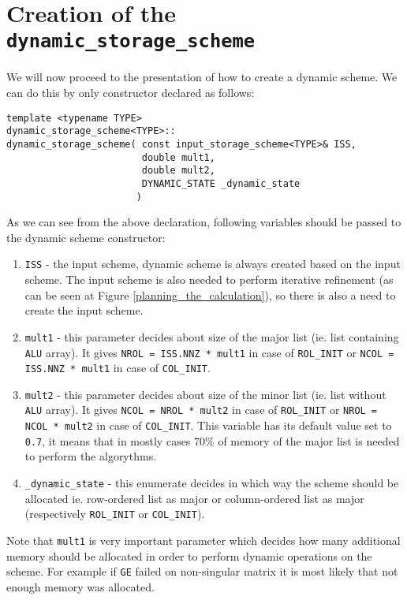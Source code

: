 \newpage

\section{Creation of the \texttt{dynamic\_storage\_scheme}}
We will now proceed to the presentation of how to create a dynamic scheme. We can do this by only constructor declared as follows:
\begin{verbatim}
template <typename TYPE>
dynamic_storage_scheme<TYPE>::
dynamic_storage_scheme( const input_storage_scheme<TYPE>& ISS,
                        double mult1,
                        double mult2,
                        DYNAMIC_STATE _dynamic_state
                       )
\end{verbatim}
\noindent As we can see from the above declaration, following variables should be passed to the dynamic scheme constructor:

\begin{enumerate}
	\item \texttt{ISS} - the input scheme, dynamic scheme is always created based on the input scheme. The input scheme is also needed to perform iterative refinement (as can be seen at Figure \ref{planning_the_calculation}), so there is also a need to create the input scheme.
	\item \texttt{mult1} - this parameter decides about size of the major list (ie. list containing \texttt{ALU} array). It gives \texttt{NROL = ISS.NNZ * mult1} in case of \texttt{ROL\_INIT} or \texttt{NCOL = ISS.NNZ * mult1} in case of \texttt{COL\_INIT}.
	\item \texttt{mult2} - this parameter decides about size of the minor list (ie. list without \texttt{ALU} array). It gives \texttt{NCOL = NROL * mult2} in case of \texttt{ROL\_INIT} or \texttt{NROL = NCOL * mult2} in case of \texttt{COL\_INIT}. This variable has its default value set to \texttt{0.7}, it means that in mostly cases $70\%$ of memory of the major list is needed to perform the algorythms.
	\item \texttt{\_dynamic\_state} - this enumerate decides in which way the scheme should be allocated ie. row-ordered list as major or column-ordered list as major (respectively \texttt{ROL\_INIT} or \texttt{COL\_INIT}).
\end{enumerate}

Note that \texttt{mult1} is very important parameter which decides how many additional memory should be allocated in order to perform dynamic operations on the scheme. For example if \texttt{GE} failed on non-singular matrix it is most likely that not enough memory was allocated.


